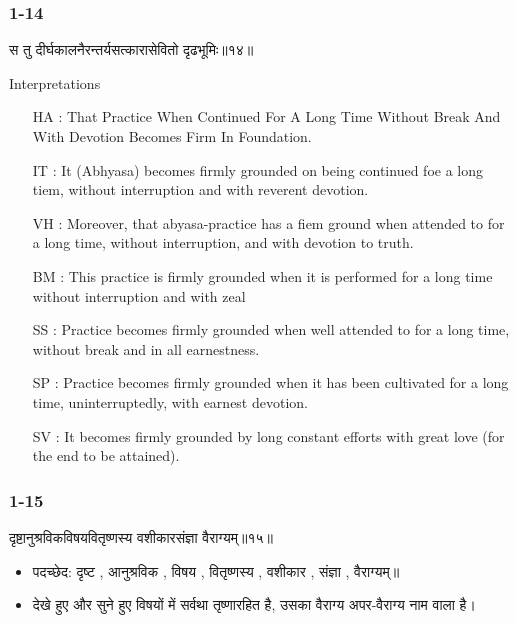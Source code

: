 \begin{frame}[fragile]\frametitle{1-14}
\begin{sanskrit}
स तु दीर्घकालनैरन्तर्यसत्कारासेवितो दृढभूमिः॥१४॥
\end{sanskrit}

Interpretations
\begin{itemize}	
\item [HA]: That Practice When Continued For A Long Time Without Break And With Devotion Becomes Firm In Foundation.
\item [IT]: It (Abhyasa) becomes firmly grounded on being continued foe a long tiem, without interruption and with reverent devotion.
\item [VH]: Moreover, that abyasa-practice has a fiem ground when attended to for a long time, without interruption, and with devotion to truth.
\item [BM]: This practice is firmly grounded when it is performed for a long time without interruption and with zeal
\item [SS]: Practice becomes firmly grounded when well attended to for a long time, without break and in all earnestness.
\item [SP]: Practice becomes firmly grounded when it has been cultivated for a long time, uninterruptedly, with earnest devotion.
\item [SV]: It becomes firmly grounded by long constant efforts with great love (for the end to be attained). 
\end{itemize}
	
\end{frame}

\begin{frame}[fragile]\frametitle{1-15}
\begin{sanskrit}
दृष्टानुश्रविकविषयवितृष्णस्य वशीकारसंज्ञा वैराग्यम्॥१५॥
\end{sanskrit}

\begin{itemize}
\item पदच्छेद: दृष्ट , आनुश्रविक , विषय , वितृष्णस्य , वशीकार , संज्ञा , वैराग्यम्॥
\item देखे हुए और सुने हुए विषयों में सर्वथा तृष्णारहित है, उसका वैराग्य अपर-वैराग्य नाम वाला है।
\end{itemize}
	
\end{frame}


